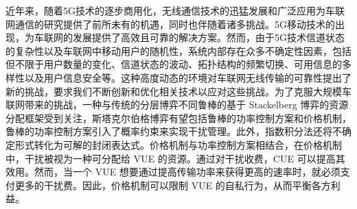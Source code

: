近年来，随着5G技术的逐步商用化，无线通信技术的迅猛发展和广泛应用为车联网通信的研究提供了前所未有的机遇，同时也伴随着诸多挑战。5G移动技术的出现，为车联网的发展提供了高效且可靠的解决方案。然而，由于5G技术信道状态的复杂性以及车联网中移动用户的随机性，系统内部存在众多不确定性因素，包括但不限于用户数量的变化、信道状态的波动、拓扑结构的频繁切换、可用信息的多样性以及用户信息安全等。这种高度动态的环境对车联网无线传输的可靠性提出了新的挑战，要求我们不断创新和优化相关技术以应对这些挑战。为了克服大规模车联网带来的挑战，一种与传统的分层博弈不同鲁棒的基于 Stackelberg 博弈的资源分配框架受到关注，斯塔克尔伯格博弈有望包括鲁棒的功率控制方案和价格机制，鲁棒的功率控制方案引入了概率约束来实现干扰管理。此外，指数积分法还将不确定形式转化为可解的封闭表达式。价格机制与功率控制方案相结合，在价格机制中，干扰被视为一种可分配给 VUE 的资源。通过对干扰收费，CUE 可以提高其效用。然而，当一个 VUE 想要通过提高传输功率来获得更高的速率时，就必须支付更多的干扰费。因此，价格机制可以限制 VUE 的自私行为，从而平衡各方利益。

